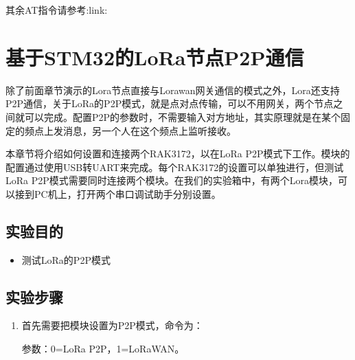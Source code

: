 \documentclass[a4paper,12pt,english]{sphinxmanual}
\begin{document}
{{\sphinxAtStartPar
其余AT指令请参考:link: 

\sphinxstepscope


\section{基于STM32的LoRa节点P2P通信}
\label{\detokenize{exp-lora/p2p-stm32:stm32lorap2p}}\label{\detokenize{exp-lora/p2p-stm32::doc}}
\sphinxAtStartPar
除了前面章节演示的Lora节点直接与Lorawan网关通信的模式之外，Lora还支持P2P通信，关于LoRa的P2P模式，就是点对点传输，可以不用网关，两个节点之间就可以完成。配置P2P的参数时，不需要输入对方地址，其实原理就是在某个固定的频点上发消息，另一个人在这个频点上监听接收。

\sphinxAtStartPar
本章节将介绍如何设置和连接两个RAK3172，以在LoRa P2P模式下工作。模块的配置通过使用USB转UART来完成。每个RAK3172的设置可以单独进行，但测试LoRa P2P模式需要同时连接两个模块。在我们的实验箱中，有两个Lora模块，可以接到PC机上，打开两个串口调试助手分别设置。


\subsection{实验目的}
\label{\detokenize{exp-lora/p2p-stm32:id1}}\begin{itemize}
\item {} 
\sphinxAtStartPar
测试LoRa的P2P模式

\end{itemize}


\subsection{实验步骤}
\label{\detokenize{exp-lora/p2p-stm32:id2}}\begin{enumerate}
%
\item {} 
\sphinxAtStartPar
首先需要把模块设置为P2P模式，命令为：

\begin{sphinxVerbatim}[commandchars=\\\{\}]
\end{sphinxVerbatim}

\sphinxAtStartPar
{} 参数：0=LoRa P2P，1=LoRaWAN。
\begin{quote}


\end{quote}
\end{enumerate}}}
\end{document}
